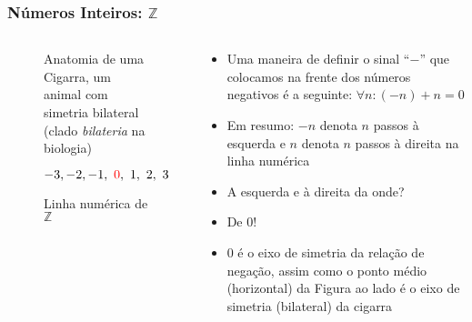 \documentclass[usenames,dvipsnames,svgnames]{beamer}
\begin{document}
\begin{frame}
	
	\frametitle{Números Inteiros: $\mathbb{Z}$}

	\begin{columns}[t]
	\begin{column}{.3\textwidth}
		\begin{figure}
			\caption{\small Anatomia de uma Cigarra, um animal com simetria bilateral (clado \emph{bilateria} na biologia)}
		\end{figure}
		\begin{figure}
			\small $-3, -2, -1, ~{\color{red}0}, ~1, ~2, ~3$
			\caption{\small Linha numérica de $\mathbb{Z}$}
		\end{figure}
	\end{column}
	\begin{column}{.7\textwidth}
		\begin{itemize}
		\item Uma maneira de definir o sinal ``$-$'' que colocamos na frente dos números negativos é a seguinte: $\forall n: (-n) + n = 0$
		\item Em resumo: $-n$ denota $n$ passos à esquerda e $n$ denota $n$ passos à direita na linha numérica
		\item A esquerda e à direita da onde?
		\item {\color{red}De $0$!}
		\item $0$ é o {\color{blue}eixo de simetria} da relação de negação, assim como o ponto médio (horizontal) da Figura ao lado é o eixo de simetria (bilateral) da cigarra
		\end{itemize}
	\end{column}
	\end{columns}

\end{frame}
\end{document}
